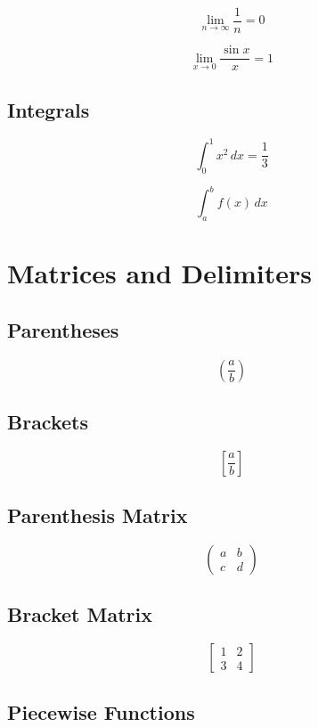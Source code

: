 \documentclass{article}
\begin{document}
\[
    \lim_{n\to\infty}\frac{1}{n}=0
\]

\[
    \lim_{x\to 0}\frac{\sin x}{x}=1
\]

\subsection{Integrals}

\[
    \int_0^1 x^2\,dx=\frac13
\]

\[
    \int_a^b f(x)\,dx
\]


\section{Matrices and Delimiters}

\subsection{Parentheses}

\[
    \left(\frac{a}{b}\right)
\]

\subsection{Brackets}

\[
    \left[\frac{a}{b}\right]
\]

\subsection{Parenthesis Matrix}

\[
    \begin{pmatrix}
        a & b \\
        c & d
    \end{pmatrix}
\]

\subsection{Bracket Matrix}

\[
    \begin{bmatrix}
        1 & 2 \\
        3 & 4
    \end{bmatrix}
\]

\subsection{Piecewise Functions}
\end{document}
